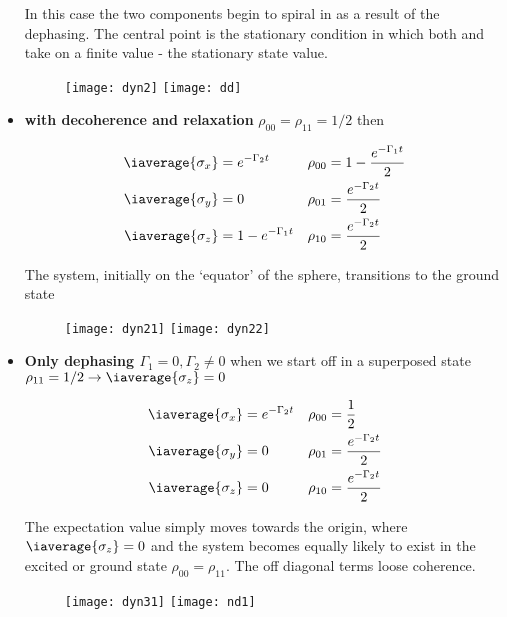 \begin{itemize}
  \noindent In  this case the  two components begin  to spiral in  as a
  result  of  the  dephasing.   The central  point  is  the  stationary
  condition in  which both   and 
  take on a finite value - the stationary state value.

   \begin{figure}[h]
     \texttt{[image: dyn2]}
     \texttt{[image: dd]}
   \end{figure}

   \newpage
 \item  \textbf{   with  decoherence  and  relaxation}
   $ \rho_{00}=\rho_{11} = 1/2 $ then

   \begin{equation}\label{dyn21}
     \begin{aligned}
       \iaverage{\sigma_x} & = e^{-\Gamma_2 t} & \rho_{00} & = 1-\frac{e^{-\Gamma_1 t}}{2}\\
       \iaverage{\sigma_y} & = 0 & \rho_{01} & = \frac{e^{-\Gamma_2 t}}{2} \\
       \iaverage{\sigma_z} & = 1 - e^{-\Gamma_1 t} & \rho_{10} & = \frac{e^{-\Gamma_2 t}}{2} \\
     \end{aligned}
   \end{equation}

   The system, initially on the `equator' of the sphere, transitions to
   the ground state

     \begin{figure}[h]
       \texttt{[image: dyn21]}
       \texttt{[image: dyn22]}
     \end{figure}

   \item       \textbf{      Only       dephasing
       $ \Gamma_1=0, \Gamma_2 \ne 0 $}  when we start off in a superposed
     state $ \rho_{11}=1/2\rightarrow\iaverage{\sigma_z}=0 $

     \begin{equation}\label{dyn3}
       \begin{aligned}
         \iaverage{\sigma_x} & = e^{-\Gamma_2 t} & \rho_{00} & = \frac{1}{2}\\
         \iaverage{\sigma_y} & = 0 & \rho_{01} & = \frac{e^{-\Gamma_2 t}}{2} \\
         \iaverage{\sigma_z} & = 0 & \rho_{10} & = \frac{e^{-\Gamma_2 t}}{2} \\
       \end{aligned}
     \end{equation}

     The  expectation  value simply  moves  towards  the origin,  where
     $ \iaverage{\sigma_z} = 0 $  and the system becomes equally likely
     to  exist in  the excited  or ground  state $  \rho_{00}=\rho_{11}
     $. The off diagonal terms loose coherence.

   \begin{figure}[h]
     \texttt{[image: dyn31]}
     \texttt{[image: nd1]}
   \end{figure}
 \end{itemize}

 {\large   {}}
 \newpage

